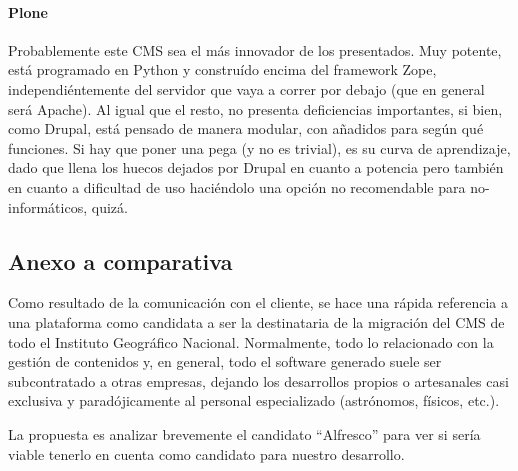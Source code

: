 \paragraph{Plone}
\par Probablemente este CMS sea el más innovador de los presentados. Muy potente, está programado en Python y construído encima del framework Zope, independiéntemente del servidor que vaya a correr por debajo (que en general será Apache).
Al igual que el resto, no presenta deficiencias importantes, si bien, como Drupal, está pensado de manera modular, con añadidos para según qué funciones.
Si hay que poner una pega (y no es trivial), es su curva de aprendizaje, dado que llena los huecos dejados por Drupal en cuanto a potencia pero también en cuanto a dificultad de uso haciéndolo una opción no recomendable para no-informáticos, quizá.

\subsection{Anexo a comparativa}
\par Como resultado de la comunicación con el cliente, se hace una rápida referencia a una plataforma como candidata a ser la destinataria de la migración del CMS de todo el Instituto Geográfico Nacional. Normalmente, todo lo relacionado con la gestión de contenidos y, en general, todo el software generado suele ser subcontratado a otras empresas, dejando los desarrollos propios o artesanales casi exclusiva y paradójicamente al personal especializado (astrónomos, físicos, etc.).
\par La propuesta es analizar brevemente el candidato ``Alfresco'' para ver si sería viable tenerlo en cuenta como candidato para nuestro desarrollo.
